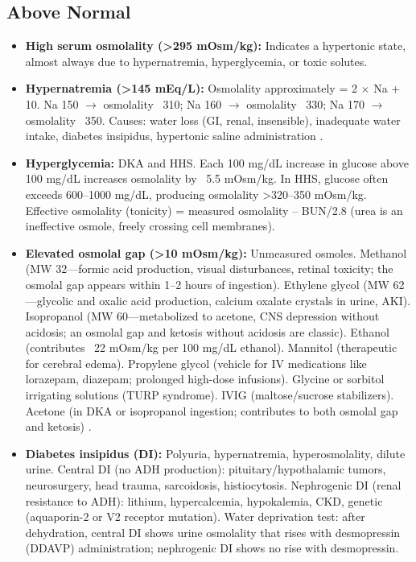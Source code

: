 \subsection*{Above Normal}
\begin{itemize}
  \item \textbf{High serum osmolality (>295 mOsm/kg):} Indicates a hypertonic state, almost always due to hypernatremia, hyperglycemia, or toxic solutes.
  \item \textbf{Hypernatremia (>145 mEq/L):} Osmolality approximately = 2 $\times$ Na + 10. Na 150 $\rightarrow$ osmolality ~310; Na 160 $\rightarrow$ osmolality ~330; Na 170 $\rightarrow$ osmolality ~350. Causes: water loss (GI, renal, insensible), inadequate water intake, diabetes insipidus, hypertonic saline administration \cite{adrogue2000hypernatremia}.
  \item \textbf{Hyperglycemia:} DKA and HHS. Each 100 mg/dL increase in glucose above 100 mg/dL increases osmolality by ~5.5 mOsm/kg. In HHS, glucose often exceeds 600--1000 mg/dL, producing osmolality >320--350 mOsm/kg. Effective osmolality (tonicity) = measured osmolality -- BUN/2.8 (urea is an ineffective osmole, freely crossing cell membranes).
  \item \textbf{Elevated osmolal gap (>10 mOsm/kg):} Unmeasured osmoles. Methanol (MW 32---formic acid production, visual disturbances, retinal toxicity; the osmolal gap appears within 1--2 hours of ingestion). Ethylene glycol (MW 62---glycolic and oxalic acid production, calcium oxalate crystals in urine, AKI). Isopropanol (MW 60---metabolized to acetone, CNS depression without acidosis; an osmolal gap and ketosis without acidosis are classic). Ethanol (contributes ~22 mOsm/kg per 100 mg/dL ethanol). Mannitol (therapeutic for cerebral edema). Propylene glycol (vehicle for IV medications like lorazepam, diazepam; prolonged high-dose infusions). Glycine or sorbitol irrigating solutions (TURP syndrome). IVIG (maltose/sucrose stabilizers). Acetone (in DKA or isopropanol ingestion; contributes to both osmolal gap and ketosis) \cite{kraut2008toxic}.
  \item \textbf{Diabetes insipidus (DI):} Polyuria, hypernatremia, hyperosmolality, dilute urine. Central DI (no ADH production): pituitary/hypothalamic tumors, neurosurgery, head trauma, sarcoidosis, histiocytosis. Nephrogenic DI (renal resistance to ADH): lithium, hypercalcemia, hypokalemia, CKD, genetic (aquaporin-2 or V2 receptor mutation). Water deprivation test: after dehydration, central DI shows urine osmolality that rises with desmopressin (DDAVP) administration; nephrogenic DI shows no rise with desmopressin.
\end{itemize}

